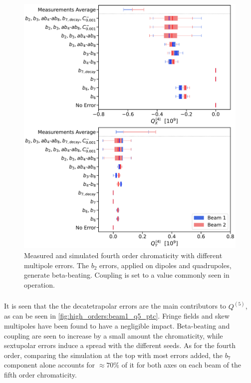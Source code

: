 \begin{figure}[!htb]
    \centering
    \includegraphics[width=0.9\columnwidth]{images/q4_ptc.pdf}
    \caption{Measured and simulated fourth order chromaticity with different multipole errors. The
    $b_2$ errors, applied on dipoles and quadrupoles, generate beta-beating. Coupling is set to a
    value commonly seen in operation.}
    \label{fig:high_orders:beam1_q4_ptc}
\end{figure}



\subsubsection{}

It is seen that the the decatetrapolar errors are the main contributors to $Q^{(5)}$, as can be seen
in \cref{fig:high_orders:beam1_q5_ptc}. Fringe fields and skew multipoles have been found to have a
negligible impact. 
Beta-beating and coupling are seen to increase by a small amount the chromaticity, while sextupolar
errors induce a spread with the different seeds. 
As for the fourth order, comparing the simulation at the top with most errors added, the $b_7$
component alone accounts for $\approx 70\%$ of it for both axes on each beam of the fifth order
chromaticity.

